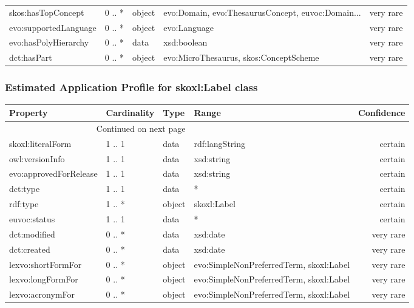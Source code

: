 \documentclass[10pt,a4paper,titlepage,final]{article}
\begin{document}
\begin{tabularx}{\textwidth}{lllXr}
     skos:hasTopConcept &      0 .. * &  object &  evo:Domain, evo:ThesaurusConcept, euvoc:Domain... &  very rare \\
  evo:supportedLanguage &      0 .. * &  object &                                       evo:Language &  very rare \\
   evo:hasPolyHierarchy &      0 .. * &    data &                                        xsd:boolean &  very rare \\
            dct:hasPart &      0 .. * &  object &             evo:MicroThesaurus, skos:ConceptScheme &  very rare \\
\end{tabularx}


\subsubsection{Estimated Application Profile for skoxl:Label class}
\begin{tabularx}{\textwidth}{lllXr}
\toprule
               Property & Cardinality &    Type &                                    Range & Confidence \\
\midrule
\endhead
\midrule
\multicolumn{3}{r}{{Continued on next page}} \\
\midrule
\endfoot

\bottomrule
\endlastfoot
      skoxl:literalForm &      1 .. 1 &    data &                           rdf:langString &    certain \\
        owl:versionInfo &      1 .. 1 &    data &                               xsd:string &    certain \\
 evo:approvedForRelease &      1 .. 1 &    data &                               xsd:string &    certain \\
               dct:type &      1 .. 1 &    data &                                        * &    certain \\
               rdf:type &      1 .. * &  object &                              skoxl:Label &    certain \\
           euvoc:status &      1 .. 1 &    data &                                        * &    certain \\
           dct:modified &      0 .. * &    data &                                 xsd:date &  very rare \\
            dct:created &      0 .. * &    data &                                 xsd:date &  very rare \\
     lexvo:shortFormFor &      0 .. * &  object &  evo:SimpleNonPreferredTerm, skoxl:Label &  very rare \\
      lexvo:longFormFor &      0 .. * &  object &  evo:SimpleNonPreferredTerm, skoxl:Label &  very rare \\
       lexvo:acronymFor &      0 .. * &  object &  evo:SimpleNonPreferredTerm, skoxl:Label &  very rare \\
\end{tabularx}
\end{document}
